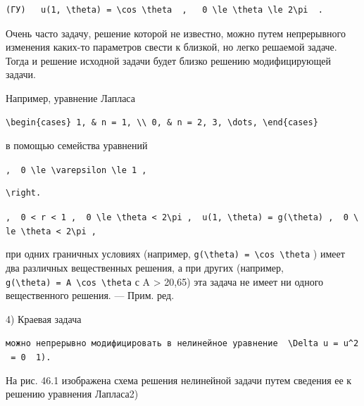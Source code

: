 \documentclass[
  ukrainian,
]{article}
\begin{document}
\begin{verbatim}
(ГУ)   u(1, \theta) = \cos \theta  ,   0 \le \theta \le 2\pi  .
\end{verbatim}

Очень часто задачу, решение которой не известно, можно путем
непрерывного изменения каких-то параметров свести к близкой, но легко
решаемой задаче. Тогда и решение исходной задачи будет близко решению
модифицирующей задачи.

Например, уравнение Лапласа

\begin{verbatim}
\begin{cases} 1, & n = 1, \\ 0, & n = 2, 3, \dots, \end{cases}
\end{verbatim}

в помощью семейства уравнений

\texttt{,\ \ \textquotesingle{}0\ \textbackslash{}le\ \textbackslash{}varepsilon\ \textbackslash{}le\ 1\textquotesingle{}\ ,}

\begin{verbatim}
\right.
\end{verbatim}

\texttt{,\ \ \textquotesingle{}0\ \textless{}\ r\ \textless{}\ 1\textquotesingle{}\ ,\ \ \textquotesingle{}0\ \textbackslash{}le\ \textbackslash{}theta\ \textless{}\ 2\textbackslash{}pi\textquotesingle{}\ ,\ \ \textquotesingle{}u(1,\ \textbackslash{}theta)\ =\ g(\textbackslash{}theta)\textquotesingle{}\ ,\ \ \textquotesingle{}0\ \textbackslash{}le\ \textbackslash{}theta\ \textless{}\ 2\textbackslash{}pi\textquotesingle{}\ ,}

при одних граничных условиях (например,
\texttt{g(\textbackslash{}theta)\ =\ \textbackslash{}cos\ \textbackslash{}theta}
) имеет два различных вещественных решения, а при других (например,
\texttt{g(\textbackslash{}theta)\ =\ A\ \textbackslash{}cos\ \textbackslash{}theta}
с A \textgreater{} 20,65) эта задача не имеет ни одного вещественного
решения. --- Прим. ред.

4) Краевая задача

\texttt{можно\ непрерывно\ модифицировать\ в\ нелинейное\ уравнение\ \ \textquotesingle{}\textbackslash{}Delta\ u\ =\ u\^{}2\ =\ 0\textquotesingle{}\ \ 1).}

На рис. 46.1 изображена схема решения нелинейной задачи путем сведения
ее к решению уравнения Лапласа2)
\end{document}
